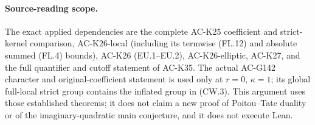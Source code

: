 \paragraph{Source-reading scope.}
The exact applied dependencies are the complete AC-K25 coefficient and
strict-kernel comparison, AC-K26-local (including its termwise (FL.12)
and absolute summed (FL.4) bounds), AC-K26 (EU.1--EU.2),
AC-K26-elliptic, AC-K27, and the full quantifier and cutoff statement
of AC-K35.  The actual AC-G142 character and original-coefficient statement
is used only at $r=0$, $\kappa=1$; its global full-local strict group
contains the inflated group in (CW.3).  This argument uses those established theorems; it does not
claim a new proof of Poitou--Tate duality or of the imaginary-quadratic
main conjecture, and it does not execute Lean.
